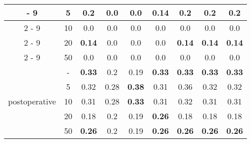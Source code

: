 \documentclass{article}%
\begin{document}
\begin{tabular}{c|c|ccccccc}
{-%
9}%
&5&\textbf{0.2}&0.0&0.0&0.14&\textbf{0.2}&\textbf{0.2}&\textbf{0.2}\\%
\cline{2%
-%
9}%
&10&0.0&0.0&0.0&0.0&0.0&0.0&0.0\\%
\cline{2%
-%
9}%
&20&\textbf{0.14}&0.0&0.0&0.0&\textbf{0.14}&\textbf{0.14}&\textbf{0.14}\\%
\cline{2%
-%
9}%
&50&0.0&0.0&0.0&0.0&0.0&0.0&0.0\\%
\hline%
\multirow{5}{*}{postoperative}&{-}&\textbf{0.33}&0.2&0.19&\textbf{0.33}&\textbf{0.33}&\textbf{0.33}&\textbf{0.33}\\%
\cline{2%
-%
9}%
&5&0.32&0.28&\textbf{0.38}&0.31&0.36&0.32&0.32\\%
\cline{2%
-%
9}%
&10&0.31&0.28&\textbf{0.33}&0.31&0.32&0.31&0.31\\%
\cline{2%
-%
9}%
&20&0.18&0.2&0.19&\textbf{0.26}&0.18&0.18&0.18\\%
\cline{2%
-%
9}%
&50&\textbf{0.26}&0.2&0.19&\textbf{0.26}&\textbf{0.26}&\textbf{0.26}&\textbf{0.26}\\%
\hline%
\end{tabular}

%
\end{document}
